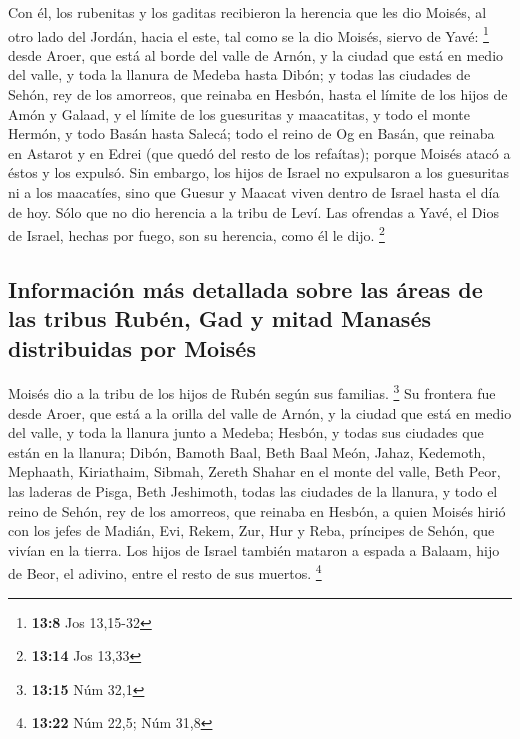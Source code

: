 \begin{paracol}{2}
 Con él, los rubenitas y los gaditas recibieron la
herencia que les dio Moisés, al otro lado del Jordán, hacia el este, tal
como se la dio Moisés, siervo de Yavé: \footnote{\textbf{13:8} Jos
  13,15-32}  desde Aroer, que está al borde del valle de
Arnón, y la ciudad que está en medio del valle, y toda la llanura de
Medeba hasta Dibón;  y todas las ciudades de Sehón, rey
de los amorreos, que reinaba en Hesbón, hasta el límite de los hijos de
Amón  y Galaad, y el límite de los guesuritas y
maacatitas, y todo el monte Hermón, y todo Basán hasta Salecá;
 todo el reino de Og en Basán, que reinaba en Astarot y
en Edrei (que quedó del resto de los refaítas); porque Moisés atacó a
éstos y los expulsó.  Sin embargo, los hijos de Israel no
expulsaron a los guesuritas ni a los maacatíes, sino que Guesur y Maacat
viven dentro de Israel hasta el día de hoy.  Sólo que no
dio herencia a la tribu de Leví. Las ofrendas a Yavé, el Dios de Israel,
hechas por fuego, son su herencia, como él le dijo. \footnote{\textbf{13:14}
  Jos 13,33}

\hypertarget{informaciuxf3n-muxe1s-detallada-sobre-las-uxe1reas-de-las-tribus-rubuxe9n-gad-y-mitad-manasuxe9s-distribuidas-por-moisuxe9s}{%
\subsection{Información más detallada sobre las áreas de las tribus
Rubén, Gad y mitad Manasés distribuidas por
Moisés}\label{informaciuxf3n-muxe1s-detallada-sobre-las-uxe1reas-de-las-tribus-rubuxe9n-gad-y-mitad-manasuxe9s-distribuidas-por-moisuxe9s}}

 Moisés dio a la tribu de los hijos de Rubén según sus
familias. \footnote{\textbf{13:15} Núm 32,1}  Su frontera
fue desde Aroer, que está a la orilla del valle de Arnón, y la ciudad
que está en medio del valle, y toda la llanura junto a Medeba;
 Hesbón, y todas sus ciudades que están en la llanura;
Dibón, Bamoth Baal, Beth Baal Meón,  Jahaz, Kedemoth,
Mephaath,  Kiriathaim, Sibmah, Zereth Shahar en el monte
del valle,  Beth Peor, las laderas de Pisga, Beth
Jeshimoth,  todas las ciudades de la llanura, y todo el
reino de Sehón, rey de los amorreos, que reinaba en Hesbón, a quien
Moisés hirió con los jefes de Madián, Evi, Rekem, Zur, Hur y Reba,
príncipes de Sehón, que vivían en la tierra.  Los hijos
de Israel también mataron a espada a Balaam, hijo de Beor, el adivino,
entre el resto de sus muertos. \footnote{\textbf{13:22} Núm 22,5; Núm
  31,8}


\end{paracol}

